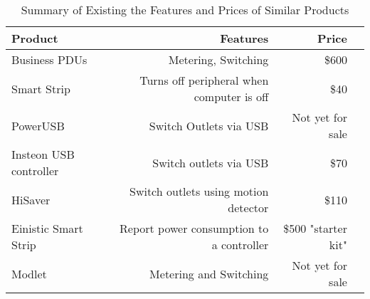 \begin{table}[H]
\begin{center}
\begin{tabular}{|l|r|r|r|}
\hline
\textbf{Product} & \textbf{Features} & \textbf{Price} \\
\hline \hline
Business PDUs & Metering, Switching & \$600\\
\hline
Smart Strip & Turns off peripheral when computer is off & \$40\\
\hline
PowerUSB & Switch Outlets via USB & Not yet for sale\\
\hline
Insteon USB controller & Switch outlets via USB & \$70\\
\hline
HiSaver & Switch outlets using motion detector  & \$110\\
\hline
Einistic Smart Strip & Report power consumption to a controller & \$500 "starter kit"\\
\hline
Modlet & Metering and Switching & Not yet for sale\\
\hline
\end{tabular}
\caption{Summary of Existing the Features and Prices of Similar Products}\label{tab:existingproducts}
\end{center}
\end{table}


